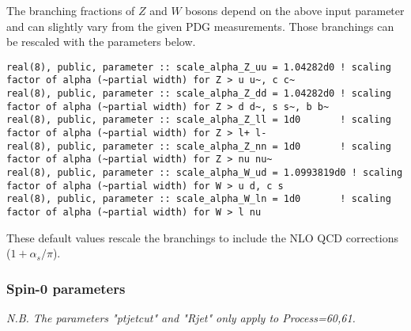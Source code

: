 \documentclass[aps,superscriptaddress,nofootinbib]{revtex4}
\begin{document}
\noindent
The branching fractions of $Z$ and $W$ bosons depend on the above input parameter and can slightly vary from the given PDG measurements.
Those branchings can be rescaled with the parameters below.
\begin{verbatim}
real(8), public, parameter :: scale_alpha_Z_uu = 1.04282d0 ! scaling factor of alpha (~partial width) for Z > u u~, c c~
real(8), public, parameter :: scale_alpha_Z_dd = 1.04282d0 ! scaling factor of alpha (~partial width) for Z > d d~, s s~, b b~
real(8), public, parameter :: scale_alpha_Z_ll = 1d0       ! scaling factor of alpha (~partial width) for Z > l+ l-
real(8), public, parameter :: scale_alpha_Z_nn = 1d0       ! scaling factor of alpha (~partial width) for Z > nu nu~
real(8), public, parameter :: scale_alpha_W_ud = 1.0993819d0 ! scaling factor of alpha (~partial width) for W > u d, c s
real(8), public, parameter :: scale_alpha_W_ln = 1d0       ! scaling factor of alpha (~partial width) for W > l nu
\end{verbatim}
These default values rescale the branchings to include the NLO QCD corrections ($1+\alpha_s/\pi$).

\subsubsection{ Spin-0 parameters }

\noindent
{\it N.B.  The parameters "ptjetcut" and "Rjet" only apply to Process=60,61.}
\end{document}
